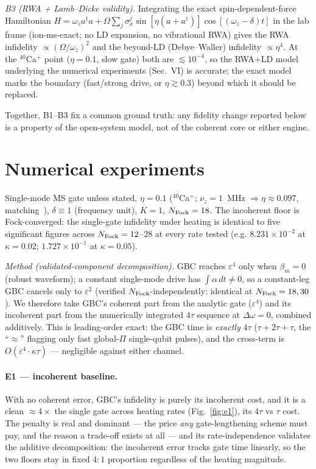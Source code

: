 \documentclass[aps,prapplied,twocolumn,superscriptaddress,floatfix,nofootinbib]{revtex4-2}
\begin{document}
\emph{B3 (RWA + Lamb--Dicke validity).} Integrating the exact spin-dependent-force Hamiltonian
$H=\omega_z a^\dagger a+\Omega\sum_j\sigma_x^j\sin[\eta(a{+}a^\dagger)]\cos[(\omega_z{-}\delta)t]$
in the lab frame (\textsf{ion-ms-exact}; no LD expansion, no vibrational RWA) gives the RWA
infidelity $\propto(\Omega/\omega_z)^2$ and the beyond-LD (Debye--Waller) infidelity
$\propto\eta^4$. At the ${}^{40}$Ca$^+$ point ($\eta=0.1$, slow gate) both are
$\lesssim\!10^{-4}$, so the RWA+LD model underlying the numerical experiments (Sec.~VI) is accurate;
the exact model marks the boundary (fast/strong drive, or $\eta\gtrsim0.3$) beyond which it should be
replaced.

Together, B1--B3 fix a common ground truth: any fidelity change reported
below is a property of the open-system model, not of the coherent core or either engine.

\section{Numerical experiments}
Single-mode MS gate unless stated, $\eta=0.1$ (${}^{40}$Ca$^+$; $\nu_z=1$~MHz
$\Rightarrow\eta\approx0.097$, matching~\cite{Zhang25}), $\delta\equiv1$ (frequency unit),
$K=1$, $N_{\rm Fock}=18$. The incoherent floor is Fock-converged: the single-gate infidelity
under heating is identical to five significant figures across $N_{\rm Fock}=12$--$28$ at every
rate tested (e.g. $8.231\times10^{-2}$ at $\kappa=0.02$; $1.727\times10^{-1}$ at $\kappa=0.05$).

\textit{Method (validated-component decomposition).} GBC reaches $\varepsilon^4$ only when
$\beta_m=0$ (robust waveform); a constant single-mode drive has $\int\alpha\,dt\neq0$, so a
constant-leg GBC cancels only to $\varepsilon^2$ (verified $N_{\rm Fock}$-independently: identical
at $N_{\rm Fock}=18,30$). We therefore take GBC's coherent part from the analytic gate
($\varepsilon^4$) and its incoherent part from the numerically integrated $4\tau$ sequence at
$\Delta\omega=0$, combined additively. This is leading-order exact: the GBC time is
\emph{exactly} $4\tau$ ($\tau{+}2\tau{+}\tau$, the ``$\approx$'' flagging only fast global-$\Pi$
single-qubit pulses), and the cross-term is $O(\varepsilon^4\!\cdot\!\kappa\tau)$ --- negligible
against either channel.

\paragraph{E1 --- incoherent baseline.} With no coherent error, GBC's infidelity is purely its
incoherent cost, and it is a clean $\approx4\times$ the single gate across heating rates
(Fig.~\ref{fig:e1}), its $4\tau$ vs $\tau$ cost. The penalty is real and dominant --- the price
\emph{any} gate-lengthening scheme must pay, and the reason a trade-off exists at all --- and its
rate-independence validates the additive decomposition: the incoherent error tracks gate time
linearly, so the two floors stay in fixed $4{:}1$ proportion regardless of the heating magnitude.
\end{document}
